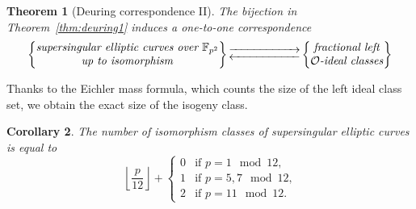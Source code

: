 \documentclass[10pt]{article}
\theoremstyle{plain}
\newtheorem{theorem}{Theorem}
\newtheorem{corollary}[theorem]{Corollary}
\theoremstyle{definition}
\def\F{\ensuremath{\mathbb{F}}}
\def\O{\ensuremath{\mathcal{O}}}
\begin{document}
\begin{prposition}
\begin{theorem}[Deuring correspondence II]
The bijection in Theorem~\ref{thm:deuring1} induces a one-to-one
correspondence
    \begin{equation*}
        \left\{
            \begin{tabular}{@{} c @{}}
                \emph{supersingular elliptic curves over $\F_{p^2}$}\\
                \emph{up to isomorphism}
            \end{tabular}
        \right\}
        \begin{gathered}
            \overset{}{\xrightarrow{\hspace*{2cm}}} \\[-2ex]
            \underset{}{\xleftarrow{\hspace*{2cm}}}
        \end{gathered}
        \left\{
            \begin{tabular}{@{} c @{}}
                \emph{fractional left} \\
                $\O$\emph{-ideal classes}
            \end{tabular}
        \right\}
    \end{equation*}
\end{theorem}


Thanks to the Eichler mass formula, which counts the size of the
left ideal class set, we obtain the exact size of the
isogeny class. %

\begin{corollary}\label{cor:eichlermass}
  The number of isomorphism classes of supersingular elliptic curves
  is equal to
  \begin{equation*}
    \left\lfloor\frac{p}{12}\right\rfloor +
    \begin{cases}
      0 &\text{if $p=1\mod 12$,}\\
      1 &\text{if $p=5,7\mod 12$,}\\
      2 &\text{if $p=11\mod 12$.}
    \end{cases}
  \end{equation*}
\end{corollary}



\end{prposition}
\end{document}
